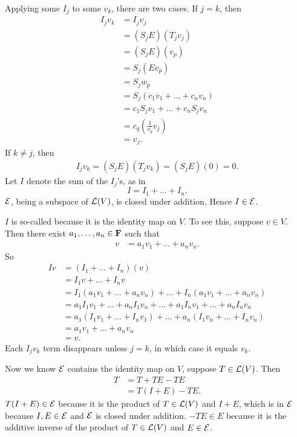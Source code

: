 \documentclass[a5paper]{article}
\begin{document}
    Applying some $I_j$ to some $v_k$, there are two cases.
    If $j=k$, then
\begin{align*}
        I_jv_k &= I_jv_j \\
               &= (S_jE)(T_jv_j) \\
                  &= (S_jE)(v_p)\\
                  &= S_j(Ev_p)\\
                  &= S_jw_p\\
                  &= S_j(c_1v_1+\dots+c_nv_n)\\
                  &= c_1S_jv_1+\dots+c_nS_jv_n\\
                  &= c_q\left(\frac{1}{c_q}v_j\right)\\
                  &= v_j.
\end{align*}
    If $k\neq j$, then
\begin{align*}
        I_jv_k = (S_jE)(T_jv_k) = (S_jE)(0) = 0 .
\end{align*}
    Let $I$ denote the sum of the $I_j$'s, as in
\begin{equation*}
        I = I_1 + \dots + I_n .
\end{equation*}
    $\mathcal{E}$, being a subspace of $\mathcal{L}(V)$, is closed under addition.
    Hence $I \in \mathcal{E}$.

    $I$ is so-called because it is the identity map on $V$.
    To see this, suppose $v \in V$.
    Then there exist $a_1,\dots,a_n \in \mathbf{F}$ such that
\begin{align*}
         v&=a_1v_1+\dots+a_nv_n .
\end{align*}
    So
\begin{align*}
        Iv &= (I_1+\dots+I_n)(v)\\
           &= I_1v + \dots + I_nv\\
           &= I_1(a_1v_1 + \dots + a_nv_n) + \dots + I_n(a_1v_1 + \dots + a_nv_n)\\
           &= a_1I_1v_1 + \dots + a_nI_1v_n + \dots + a_1I_nv_1 + \dots + a_nI_nv_n\\
           &= a_1(I_1v_1 + \dots + I_nv_1) + \dots + a_n(I_1v_n + \dots + I_nv_n)\\
           &= a_1v_1 + \dots + a_nv_n\\
           &= v .
\end{align*}
    Each $I_jv_k$ term disappears unless $j=k$, in which case it equals $v_k$.

    Now we know $\mathcal{E}$ contains the identity map on $V$, suppose $T \in \mathcal{L}(V)$.
    Then
\begin{align*}
        T &= T + TE - TE \\
          &= T(I + E) - TE .
\end{align*}
    $T(I+E) \in \mathcal{E}$ because it is the product of $T \in \mathcal{L}(V)$ and $I+E$, which is in $\mathcal{E}$ because $I,E \in \mathcal{E}$ and $\mathcal{E}$ is closed under addition.
    $-TE \in E$ because it is the additive inverse of the product of $T \in \mathcal{L}(V)$ and $E \in \mathcal{E}$.
\end{document}
